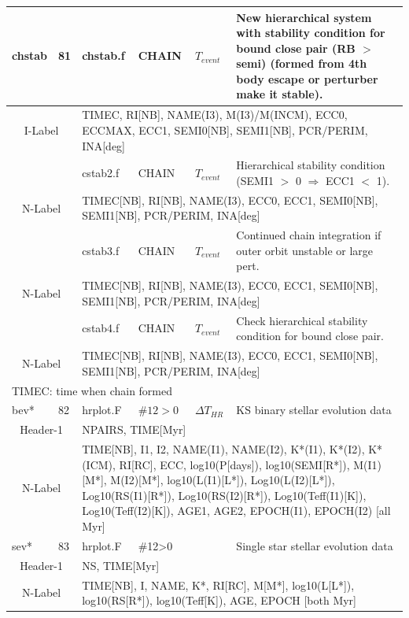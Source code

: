 \begin{longtable}{||p{0.42in}|p{0.25in}|p{0.6in}|p{0.6in}|p{0.4in}|p{2.3in}||}
  chstab     & 81  & chstab.f   & CHAIN   & $T_{event}$    & New hierarchical system with stability condition for bound close pair (RB $>$ semi) (formed from 4th body escape or perturber make it stable).\\\hline
\multicolumn{2}{|c|}{ I-Label } & \multicolumn{4}{|p{4.4in}|}{ TIMEC, RI[NB], NAME(I3), M(I3)/M(INCM), ECC0, ECCMAX, ECC1, SEMI0[NB], SEMI1[NB], PCR/PERIM, INA[deg] } \\\hline
           &     & cstab2.f   & CHAIN   & $T_{event}$    & Hierarchical stability condition (SEMI1 $>$ 0 $\Rightarrow$ ECC1 $<$ 1). \\\hline
\multicolumn{2}{|c|}{ N-Label } & \multicolumn{4}{|p{4.4in}|}{ TIMEC[NB], RI[NB], NAME(I3), ECC0, ECC1, SEMI0[NB], SEMI1[NB], PCR/PERIM, INA[deg]}\\\hline
           &     & cstab3.f   & CHAIN   & $T_{event}$    & Continued chain integration if outer orbit unstable or large pert. \\\hline
\multicolumn{2}{|c|}{ N-Label } & \multicolumn{4}{|p{4.4in}|}{ TIMEC[NB], RI[NB], NAME(I3), ECC0, ECC1, SEMI0[NB], SEMI1[NB], PCR/PERIM, INA[deg]} \\\hline
           &     & cstab4.f   & CHAIN   & $T_{event}$    & Check hierarchical stability condition for bound close pair.    \\\hline
\multicolumn{2}{|c|}{ N-Label } & \multicolumn{4}{|p{4.4in}|}{ TIMEC[NB], RI[NB], NAME(I3), ECC0, ECC1, SEMI0[NB], SEMI1[NB], PCR/PERIM, INA[deg]} \\\hline
\multicolumn{6}{|p{5.4in}|}{ TIMEC: time when chain formed }\\
\hline\hline

  bev*     & 82  & hrplot.F   & $\#12>0$   & $\Delta T_{HR}$      & KS binary stellar evolution data \\\hline
\multicolumn{2}{|c|}{ Header-1} & \multicolumn{4}{|p{4.4in}|}{ NPAIRS, TIME[Myr] }\\\hline
\multicolumn{2}{|c|}{ N-Label } & \multicolumn{4}{|p{4.4in}|}{ TIME[NB], I1, I2, NAME(I1), NAME(I2), K*(I1), K*(I2), K*(ICM), RI[RC], ECC, log10(P[days]), log10(SEMI[R*]), M(I1)[M*], M(I2)[M*], log10(L(I1)[L*]), Log10(L(I2)[L*]), Log10(RS(I1)[R*]), Log10(RS(I2)[R*]), Log10(Teff(I1)[K]), Log10(Teff(I2)[K]), AGE1, AGE2, EPOCH(I1), EPOCH(I2) [all Myr] }\\\hline\hline

  sev*     & 83  & hrplot.F   & \#12>0    &             & Single star stellar evolution data  \\\hline
\multicolumn{2}{|c|}{ Header-1} & \multicolumn{4}{|p{4.4in}|}{ NS, TIME[Myr]} \\\hline
\multicolumn{2}{|c|}{ N-Label } & \multicolumn{4}{|p{4.4in}|}{ TIME[NB], I, NAME, K*, RI[RC], M[M*], log10(L[L*]), log10(RS[R*]), log10(Teff[K]), AGE, EPOCH [both Myr]} \\\hline\hline


\end{longtable}
